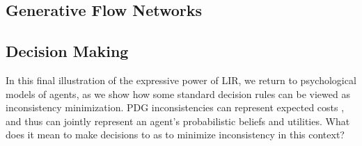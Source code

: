 \documentclass[twoside]{article}
\let\cite\citep
\theoremstyle{plain}
\theoremstyle{definition}
\theoremstyle{remark}
\begin{document}
\subsection{Generative Flow Networks}



\subsection{Decision Making}
In this final illustration of the 
expressive power of LIR, we return to psychological models of agents,
as we show how some standard decision rules can be viewed as inconsistency minimization. 
% 
PDG inconsistencies can represent expected costs \cite[\S 4, \S6]{oli-dissertation},
and thus can jointly represent an agent's probabilistic beliefs and utilities.
%
What does it mean to make decisions to as to minimize inconsistency in this context? 
\end{document}

